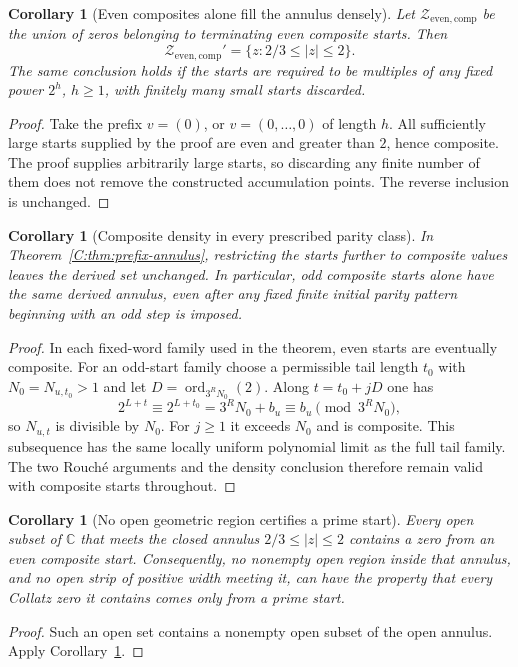 \documentclass[11pt,a4paper]{article}
\newtheorem{corollary}[theorem]{Corollary}
\theoremstyle{definition}
\theoremstyle{remark}
\numberwithin{equation}{section}
\begin{document}
\begin{corollary}[Even composites alone fill the annulus densely]
\label{C:cor:even-composite-annulus}
Let $\mathcal Z_{\mathrm{even,comp}}$ be the union of zeros belonging
to terminating even composite starts. Then
\[
 \mathcal Z_{\mathrm{even,comp}}'
 =\{z:2/3\le|z|\le2\}.
\]
The same conclusion holds if the starts are required to be multiples
of any fixed power $2^h$, $h\ge1$, with finitely many small starts
discarded.
\end{corollary}
\begin{proof}
Take the prefix $v=(0)$, or $v=(0,\ldots,0)$ of length $h$.
All sufficiently large starts supplied by the proof are even and
greater than $2$, hence composite. The proof supplies arbitrarily large
starts, so discarding any finite number of them does not remove the
constructed accumulation points. The reverse inclusion is unchanged.
\end{proof}

\begin{corollary}[Composite density in every prescribed parity class]
\label{C:cor:composite-prefix-annulus}
In Theorem~\ref{C:thm:prefix-annulus}, restricting the starts further to
composite values leaves the derived set unchanged. In particular, odd
composite starts alone have the same derived annulus, even after any
fixed finite initial parity pattern beginning with an odd step is imposed.
\end{corollary}
\begin{proof}
In each fixed-word family used in the theorem, even starts are eventually
composite. For an odd-start family choose a permissible tail length $t_0$
with $N_0=N_{u,t_0}>1$ and let
$D=\operatorname{ord}_{3^R N_0}(2)$. Along $t=t_0+jD$ one has
\[
 2^{L+t}\equiv2^{L+t_0}=3^R N_0+b_u
 \equiv b_u\pmod{3^R N_0},
\]
so $N_{u,t}$ is divisible by $N_0$. For $j\ge1$ it exceeds $N_0$ and
is composite. This subsequence has the same locally uniform polynomial
limit as the full tail family. The two Rouch\'e arguments and the density
conclusion therefore remain valid with composite starts throughout.
\end{proof}

\begin{corollary}[No open geometric region certifies a prime start]
\label{C:cor:no-open-prime-locus}
Every open subset of $\mathbb C$ that meets the closed annulus
$2/3\le|z|\le2$ contains a zero from an even composite start.
Consequently, no nonempty open region inside that annulus, and no open strip
of positive width meeting it, can have the property that every Collatz
zero it contains comes only from a prime start.
\end{corollary}
\begin{proof}
Such an open set contains a nonempty open subset of the open annulus.
Apply Corollary~\ref{C:cor:even-composite-annulus}.
\end{proof}
\end{document}
